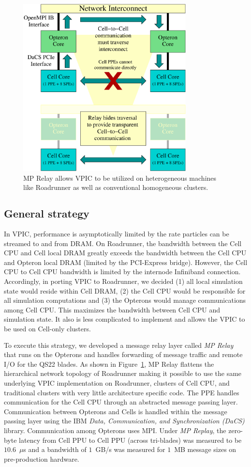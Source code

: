 \documentclass[journal,twoside]{IEEEtran}
\newcommand{\fig}[1]{Figure~\ref{fig:#1}}
\begin{document}
\begin{figure}
\begin{center}
\includegraphics[width=3.5in]{figs/relay.eps}
\caption{MP Relay allows VPIC to be utilized on heterogeneous
machines like Roadrunner as well as conventional homogeneous
clusters.}
\label{fig:relay}
\end{center}
\end{figure}

\subsection{General strategy}

In VPIC, performance is asymptotically limited by the rate particles
can be streamed to and from DRAM.  On Roadrunner, the bandwidth
between the Cell CPU and Cell local DRAM greatly exceeds the bandwidth
between the Cell CPU and Opteron local DRAM (limited by the
PCI-Express bridge).  However, the Cell CPU to Cell CPU bandwidth is
limited by the internode Infiniband connection.  Accordingly, in
porting VPIC to Roadrunner, we decided (1) all local simulation state
would reside within Cell DRAM, (2) the Cell CPU would be responsible
for all simulation computations and (3) the Opterons would manage
communications among Cell CPU.  This maximizes the bandwidth between
Cell CPU and simulation state.  It also is less complicated to
implement and allows the VPIC to be used on Cell-only clusters.

To execute this strategy, we developed a message relay layer called
\emph{MP Relay} that runs on the Opterons and handles forwarding of
message traffic and remote I/O for the QS22 blades.  As shown in
\fig{relay}, MP Relay flattens the hierarchical network topology of
Roadrunner making it possible to use the same underlying VPIC
implementation on Roadrunner, clusters of Cell CPU, and traditional
clusters with very little architecture specific code.  The PPE handles
communication for the Cell CPU through an abstracted message passing
layer.  Communication between Opterons and Cells is handled within the
message passing layer using the IBM \emph{Data, Communication, and
Synchronization (DaCS)} library.  Communication among Opterons uses
MPI.  Under \emph{MP Replay}, the zero-byte latency from Cell PPU to
Cell PPU (across tri-blades) was measured to be $10.6$~$\mu$s and a
bandwidth of $1$~GB/s was measured for $1$~MB message sizes on
pre-production hardware.
\end{document}
